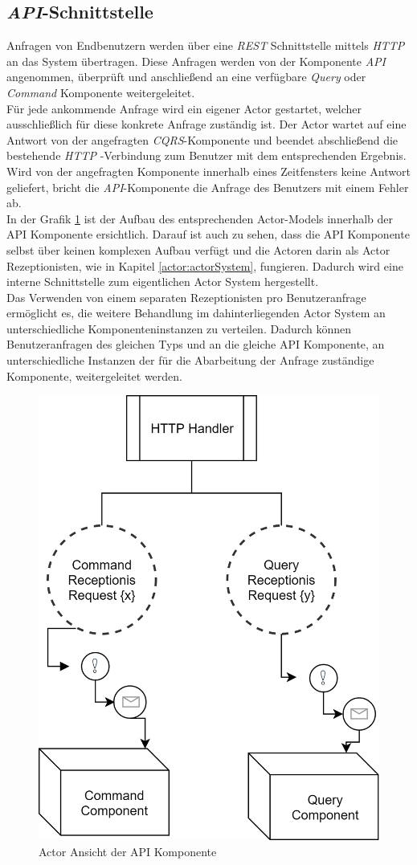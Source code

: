 \subsection{\textit{API}-Schnittstelle}
\label{subsec:implementation:apiComponente}
Anfragen von Endbenutzern werden über eine \textit{REST} Schnittstelle mittels \textit{HTTP} an das System übertragen. Diese Anfragen werden von der Komponente \textit{API} angenommen, überprüft und anschließend an eine verfügbare \textit{Query} oder \textit{Command} Komponente weitergeleitet. \\
Für jede ankommende Anfrage wird ein eigener Actor gestartet, welcher ausschließlich für diese konkrete Anfrage zuständig ist. Der Actor wartet auf eine Antwort von der angefragten \textit{CQRS}-Komponente und beendet abschließend die bestehende \textit{HTTP} -Verbindung zum Benutzer mit dem entsprechenden Ergebnis. Wird von der angefragten Komponente innerhalb eines Zeitfensters keine Antwort geliefert, bricht die \textit{API}-Komponente die Anfrage des Benutzers mit einem Fehler ab. \\
In der Grafik \ref{fig:implementation:apiActorModel} ist der Aufbau des entsprechenden  Actor-Models innerhalb der API Komponente ersichtlich. Darauf ist auch zu sehen, dass die API Komponente selbst über keinen komplexen Aufbau verfügt und die Actoren darin als Actor Rezeptionisten, wie in Kapitel \ref{actor:actorSystem}, fungieren. Dadurch wird eine interne Schnittstelle zum eigentlichen Actor System hergestellt. \\
Das Verwenden von einem separaten Rezeptionisten pro Benutzeranfrage ermöglicht es, die weitere Behandlung im dahinterliegenden Actor System an unterschiedliche Komponenteninstanzen zu verteilen. Dadurch können Benutzeranfragen des gleichen Typs und an die gleiche API Komponente, an unterschiedliche Instanzen der für die Abarbeitung der Anfrage zuständige Komponente, weitergeleitet werden. 
\begin{figure}
  \centering
  \includegraphics[width=0.5\linewidth]{gfx/implementation/apiActorModel}
  \caption{Actor Ansicht der API Komponente}
  \label{fig:implementation:apiActorModel}
\end{figure} 

